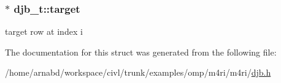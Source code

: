 \subsubsection[{target}]{$\ast$ djb\+\_\+t\+::target}\label{structdjb__t_adf9374605be2bbe0d61acc5ab00f75d6}
target row at index i 

The documentation for this struct was generated from the following file\+:\begin{DoxyCompactItemize}
\item 
/home/arnabd/workspace/civl/trunk/examples/omp/m4ri/m4ri/\hyperlink{djb_8h}{djb.\+h}\end{DoxyCompactItemize}
